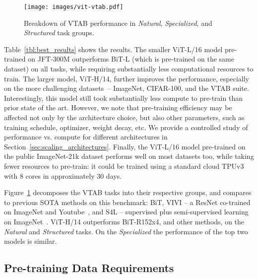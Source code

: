 \documentclass{article} \usepackage{iclr2021_conference,times}
\newcommand{\oursabbrv}{ViT\xspace}
\newcommand{\imagenet}{ImageNet\xspace}
\begin{document}
\begin{figure}[]
\begin{center}
\texttt{[image: images/vit-vtab.pdf]}
\end{center}
\caption{Breakdown of VTAB performance in \textit{Natural}, \textit{Specialized}, and \textit{Structured} task groups. 
}
\label{fig:vtab}
\vspace{-3mm}
\end{figure}


Table~\ref{tbl:best_results} shows the results.
The smaller \oursabbrv-L/16 model pre-trained on JFT-300M outperforms BiT-L (which is pre-trained on the same dataset) on all tasks, while requiring substantially less computational resources to train.
The larger model, \oursabbrv-H/14, further improves the performance, especially on the more challenging datasets~-- \imagenet, CIFAR-100, and the VTAB suite.
Interestingly, this model still took substantially less compute to pre-train than prior state of the art. However, we note that pre-training efficiency may be affected not only by the architecture choice, but also other parameters, such as training schedule, optimizer, weight decay, etc.
We provide a controlled study of performance vs. compute for different architectures in Section~\ref{sec:scaling_architectures}.
Finally, the \oursabbrv-L/16 model pre-trained on the public ImageNet-21k dataset performs well on most datasets too, while taking fewer resources to pre-train: it could be trained using a standard cloud TPUv3 with 8 cores in approximately 30 days.

Figure~\ref{fig:vtab} decomposes the VTAB tasks into their respective groups, and compares to previous SOTA methods on this benchmark:
BiT,
VIVI -- a ResNet co-trained on \imagenet and Youtube~\citep{vivi},
and S4L -- supervised plus semi-supervised learning on \imagenet~\citep{zhai2019s4l}.
\oursabbrv{}-H/14 outperforms BiT-R152x4, and other methods, on the \textit{Natural} and \textit{Structured} tasks.
On the \textit{Specialized} the performance of the top two models is similar.

\subsection{Pre-training Data Requirements}
\label{sec:data_efficiency}
\end{document}
